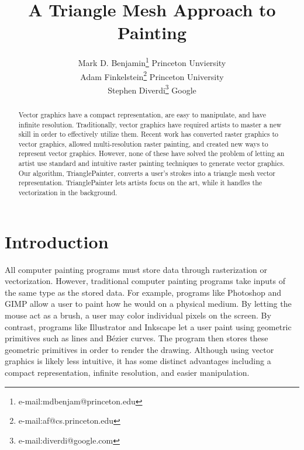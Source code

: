 \documentclass[conference]{acmsiggraph}
\title{A Triangle Mesh Approach to Painting}
\author{Mark D. Benjamin\thanks{e-mail:mdbenjam@princeton.edu} \hspace{10 pt} Princeton Unviersity\\ Adam Finkelstein\thanks{e-mail:af@cs.princeton.edu} \hspace{10 pt} Princeton University\\ Stephen Diverdi\thanks{e-mail:diverdi@google.com} \hspace{10 pt} Google}
\begin{document}

\maketitle

\begin{abstract}
Vector graphics have a compact representation, are easy to manipulate, and have infinite resolution.
Traditionally, vector graphics have required artists to master a new skill in order to effectively utilize
them. Recent work has converted raster graphics to vector graphics, allowed multi-resolution raster painting,
and created new ways to represent vector graphics. However, none of these have solved the problem of
letting an artist use standard and intuitive raster painting techniques to generate vector graphics.
Our algorithm, TrianglePainter, converts a user's strokes into a triangle mesh vector representation. 
TrianglePainter lets artists focus on the art, while it handles the vectorization in the background.

\end{abstract}

\begin{CRcatlist}
\end{CRcatlist}

\keywordlist


\TOGlinkslist


\copyrightspace

\section{Introduction}

All computer painting programs must store data through rasterization or vectorization. 
However, traditional computer painting programs take inputs of the same type as the stored data. 
For example, programs like Photoshop and GIMP
allow a user to paint how he would on a physical medium. By letting the mouse act as
a brush, a user may color individual pixels on the screen. By contrast, programs like 
Illustrator and Inkscape let a user paint
using geometric primitives such as lines and B\'{e}zier curves. The program then stores
these geometric primitives in order to render the drawing. Although using vector graphics
is likely less intuitive, it has some distinct advantages including a compact
representation, infinite resolution, and easier manipulation.
\end{document}
